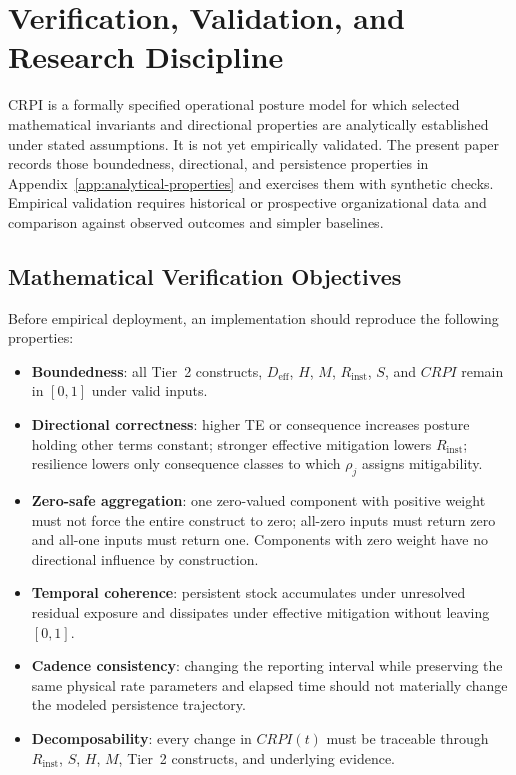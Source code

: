 \documentclass[11pt]{article}
\begin{document}
\FloatBarrier
\section{Verification, Validation, and Research Discipline}
\label{sec:verification}
CRPI is a formally specified operational posture model for which selected mathematical
invariants and directional properties are analytically established under stated
assumptions. It is not yet empirically validated. The present paper records those
boundedness, directional, and persistence properties in Appendix~\ref{app:analytical-properties}
and exercises them with synthetic checks. Empirical validation requires historical or
prospective organizational data and comparison against observed outcomes and simpler
baselines.

\subsection{Mathematical Verification Objectives}
Before empirical deployment, an implementation should reproduce the following
properties:
\begin{itemize}
  \item \textbf{Boundedness}: all Tier~2 constructs, $D_{\mathrm{eff}}$, $H$, $M$,
    $R_{\mathrm{inst}}$, $S$, and $CRPI$ remain in $[0,1]$ under valid inputs.
  \item \textbf{Directional correctness}: higher TE or consequence increases posture
    holding other terms constant; stronger effective mitigation lowers
    $R_{\mathrm{inst}}$; resilience lowers only consequence classes to which $\rho_j$
    assigns mitigability.
  \item \textbf{Zero-safe aggregation}: one zero-valued component with positive weight
    must not force the entire construct to zero; all-zero inputs must return zero and
    all-one inputs must return one. Components with zero weight have no directional
    influence by construction.
  \item \textbf{Temporal coherence}: persistent stock accumulates under unresolved
    residual exposure and dissipates under effective mitigation without leaving
    $[0,1]$.
  \item \textbf{Cadence consistency}: changing the reporting interval while preserving
    the same physical rate parameters and elapsed time should not materially change the
    modeled persistence trajectory.
  \item \textbf{Decomposability}: every change in $CRPI(t)$ must be traceable through
    $R_{\mathrm{inst}}$, $S$, $H$, $M$, Tier~2 constructs, and underlying evidence.
\end{itemize}
\end{document}
